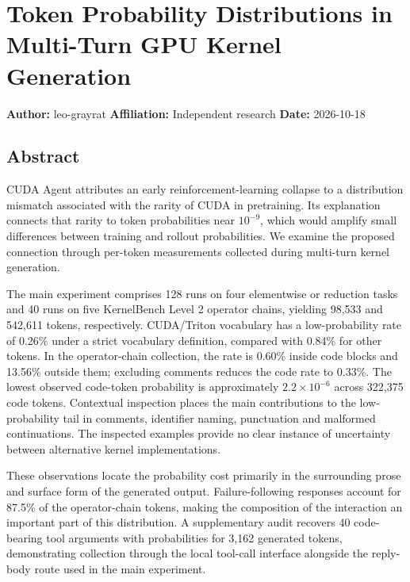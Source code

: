 \documentclass[
  11pt,
]{article}
\author{}
\date{}
\begin{document}
\hypertarget{token-probability-distributions-in-multi-turn-gpu-kernel-generation}{%
\section{Token Probability Distributions in Multi-Turn GPU Kernel
Generation}\label{token-probability-distributions-in-multi-turn-gpu-kernel-generation}}

\textbf{Author:} leo-grayrat \textbf{Affiliation:} Independent research
\textbf{Date:} 2026-10-18

\hypertarget{abstract}{%
\subsection{Abstract}\label{abstract}}

CUDA Agent attributes an early reinforcement-learning collapse to a
distribution mismatch associated with the rarity of CUDA in pretraining.
Its explanation connects that rarity to token probabilities near
\(10^{-9}\), which would amplify small differences between training and
rollout probabilities. We examine the proposed connection through
per-token measurements collected during multi-turn kernel generation.

The main experiment comprises 128 runs on four elementwise or reduction
tasks and 40 runs on five KernelBench Level 2 operator chains, yielding
98,533 and 542,611 tokens, respectively. CUDA/Triton vocabulary has a
low-probability rate of 0.26\% under a strict vocabulary definition,
compared with 0.84\% for other tokens. In the operator-chain collection,
the rate is 0.60\% inside code blocks and 13.56\% outside them;
excluding comments reduces the code rate to 0.33\%. The lowest observed
code-token probability is approximately \(2.2\times10^{-6}\) across
322,375 code tokens. Contextual inspection places the main contributions
to the low-probability tail in comments, identifier naming, punctuation
and malformed continuations. The inspected examples provide no clear
instance of uncertainty between alternative kernel implementations.

These observations locate the probability cost primarily in the
surrounding prose and surface form of the generated output.
Failure-following responses account for 87.5\% of the operator-chain
tokens, making the composition of the interaction an important part of
this distribution. A supplementary audit recovers 40 code-bearing tool
arguments with probabilities for 3,162 generated tokens, demonstrating
collection through the local tool-call interface alongside the
reply-body route used in the main experiment.
\end{document}
